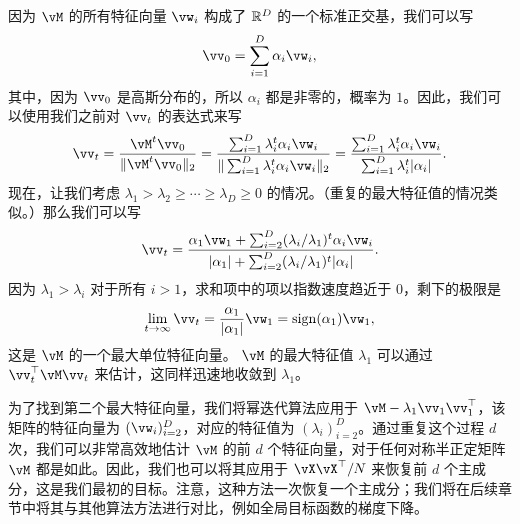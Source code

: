 \documentclass[../../book-main.tex]{subfiles}
\begin{document}
因为 \(\vM\) 的所有特征向量 \(\vw_{i}\) 构成了 \(\mathbb{R}^{D}\) 的一个标准正交基，我们可以写
\begin{equation}
    \vv_{0} = \sum_{i = 1}^{D}\alpha_{i}\vw_{i},
\end{equation}
其中，因为 \(\vv_{0}\) 是高斯分布的，所以 \(\alpha_{i}\) 都是非零的，概率为 \(1\)。因此，我们可以使用我们之前对 \(\vv_{t}\) 的表达式来写
\begin{equation}
    \vv_{t} = \frac{\vM^{t}\vv_{0}}{\norm{\vM^{t}\vv_{0}}_{2}} = \frac{\sum_{i = 1}^{D}\lambda_{i}^{t}\alpha_{i}\vw_{i}}{\norm{\sum_{i = 1}^{D}\lambda_{i}^{t}\alpha_{i}\vw_{i}}_{2}} = \frac{\sum_{i = 1}^{D}\lambda_{i}^{t}\alpha_{i}\vw_{i}}{\sum_{i = 1}^{D}\lambda_{i}^{t}\abs{\alpha_{i}}}. 
\end{equation}
现在，让我们考虑 \(\lambda_{1} > \lambda_{2} \geq \cdots \geq \lambda_{D} \geq 0\) 的情况。（重复的最大特征值的情况类似。）那么我们可以写
\begin{equation}
    \vv_{t} = \frac{\alpha_{1}\vw_{1} + \sum_{i = 2}^{D}(\lambda_{i}/\lambda_{1})^{t}\alpha_{i}\vw_{i}}{\abs{\alpha_{1}} + \sum_{i = 2}^{D}(\lambda_{i}/\lambda_{1})^{t}\abs{\alpha_{i}}}.
\end{equation}
因为 \(\lambda_{1} > \lambda_{i}\) 对于所有 \(i > 1\)，求和项中的项以指数速度趋近于 \(0\)，剩下的极限是
\begin{equation}
    \lim_{t \to \infty}\vv_{t} = \frac{\alpha_{1}}{\abs{\alpha_{1}}}\vw_{1} = \sign(\alpha_{1})\vw_{1},
\end{equation}
这是 \(\vM\) 的一个最大单位特征向量。 \(\vM\) 的最大特征值 \(\lambda_{1}\) 可以通过 \(\vv_{t}^{\top}\vM\vv_{t}\) 来估计，这同样迅速地收敛到 \(\lambda_{1}\)。

为了找到第二个最大特征向量，我们将幂迭代算法应用于 \(\vM - \lambda_{1}\vv_{1}\vv_{1}^{\top}\)，该矩阵的特征向量为 \((\vw_{i})_{i = 2}^{D}\)，对应的特征值为 \((\lambda_{i})_{i = 2}^{D}\)。通过重复这个过程 \(d\) 次，我们可以非常高效地估计 \(\vM\) 的前 \(d\) 个特征向量，对于任何对称半正定矩阵 \(\vM\) 都是如此。因此，我们也可以将其应用于 \(\vX\vX^{\top}/N\) 来恢复前 \(d\) 个主成分，这是我们最初的目标。注意，这种方法一次恢复一个主成分；我们将在后续章节中将其与其他算法方法进行对比，例如全局目标函数的梯度下降。


\end{document}

